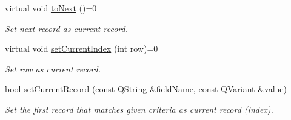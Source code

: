 \begin{DoxyCompactItemize}
virtual void \hyperlink{classmdt_abstract_sql_widget_a8ed6bb811c992fcc8bba8da9f675cd88}{toNext} ()=0
\begin{DoxyCompactList}\small\item\em Set next record as current record. \end{DoxyCompactList}\item 
virtual void \hyperlink{classmdt_abstract_sql_widget_a619725b15f305e216ba9ce9dc0ab9e3c}{setCurrentIndex} (int row)=0
\begin{DoxyCompactList}\small\item\em Set row as current record. \end{DoxyCompactList}\item 
bool \hyperlink{classmdt_abstract_sql_widget_a49624704409e34459084201ccb8e9399}{setCurrentRecord} (const QString \&fieldName, const QVariant \&value)
\begin{DoxyCompactList}\small\item\em Set the first record that matches given criteria as current record (index). \end{DoxyCompactList}\end{DoxyCompactItemize}
